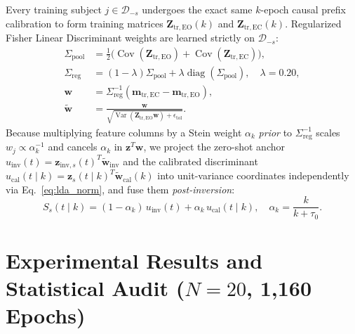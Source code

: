 \documentclass[10pt,twocolumn]{article}
\begin{document}
Every training subject $j \in \mathcal{D}_{-s}$ undergoes the exact same $k$-epoch causal prefix calibration to form training matrices $\mathbf{Z}_{\mathrm{tr,EO}}(k)$ and $\mathbf{Z}_{\mathrm{tr,EC}}(k)$. Regularized Fisher Linear Discriminant weights are learned strictly on $\mathcal{D}_{-s}$:
\begin{align}
    \Sigma_{\mathrm{pool}} &= \frac{1}{2}\big(\operatorname{Cov}(\mathbf{Z}_{\mathrm{tr,EO}}) + \operatorname{Cov}(\mathbf{Z}_{\mathrm{tr,EC}})\big), \\
    \Sigma_{\mathrm{reg}} &= (1 - \lambda)\Sigma_{\mathrm{pool}} + \lambda\operatorname{diag}(\Sigma_{\mathrm{pool}}), \quad \lambda = 0.20, \\
    \mathbf{w} &= \Sigma_{\mathrm{reg}}^{-1}(\mathbf{m}_{\mathrm{tr,EC}} - \mathbf{m}_{\mathrm{tr,EO}}), \\
    \tilde{\mathbf{w}} &= \frac{\mathbf{w}}{\sqrt{\operatorname{Var}(\mathbf{Z}_{\mathrm{tr,EO}}\mathbf{w}) + \epsilon_{\mathrm{tol}}}}.
    \label{eq:lda_norm}
\end{align}
Because multiplying feature columns by a Stein weight $\alpha_k$ \textit{prior} to $\Sigma_{\mathrm{reg}}^{-1}$ scales $w_j \propto \alpha_k^{-1}$ and cancels $\alpha_k$ in $\mathbf{z}^T\mathbf{w}$, we project the zero-shot anchor $u_{\mathrm{inv}}(t) = \mathbf{z}_{\mathrm{inv},s}(t)^T\tilde{\mathbf{w}}_{\mathrm{inv}}$ and the calibrated discriminant $u_{\mathrm{cal}}(t \mid k) = \mathbf{z}_s(t \mid k)^T\tilde{\mathbf{w}}_{\mathrm{cal}}(k)$ into unit-variance coordinates independently via Eq.~\eqref{eq:lda_norm}, and fuse them \textit{post-inversion}:
\begin{equation}
    S_s(t \mid k) = (1 - \alpha_k)\,u_{\mathrm{inv}}(t) + \alpha_k\,u_{\mathrm{cal}}(t \mid k), \quad \alpha_k = \frac{k}{k + \tau_0}.
    \label{eq:fusion}
\end{equation}

\section{Experimental Results and Statistical Audit ($N=20$, 1,160 Epochs)}
\end{document}
